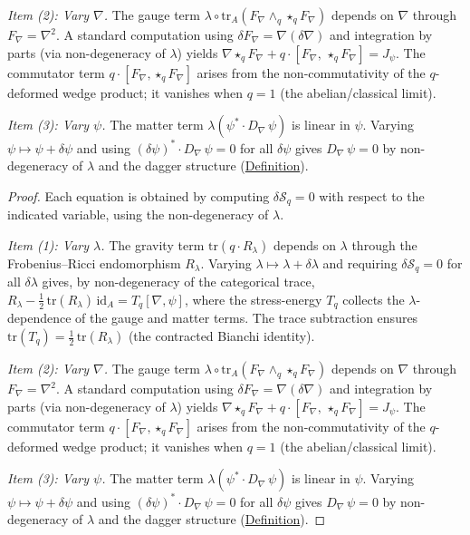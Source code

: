 \begin{proposition}
\emph{Item (2): Vary $\nabla$.}
The gauge term
$\lambda \circ \mathrm{tr}_A(F_\nabla \wedge_q \star_q F_\nabla)$
depends on $\nabla$ through $F_\nabla = \nabla^2$.  A standard
computation using $\delta F_\nabla = \nabla(\delta\nabla)$ and
integration by parts (via non-degeneracy of $\lambda$) yields
$\nabla \star_q F_\nabla + q \cdot [F_\nabla,\, \star_q F_\nabla]
= J_\psi$.
The commutator term $q \cdot [F_\nabla, \star_q F_\nabla]$ arises from
the non-commutativity of the $q$-deformed wedge product; it vanishes
when $q = 1$ (the abelian/classical limit).

\emph{Item (3): Vary $\psi$.}
The matter term $\lambda(\psi^* \cdot D_\nabla\,\psi)$ is linear
in $\psi$.  Varying $\psi \mapsto \psi + \delta\psi$ and using
$(\delta\psi)^* \cdot D_\nabla\,\psi = 0$ for
all $\delta\psi$ gives $D_\nabla\,\psi = 0$ by non-degeneracy
of $\lambda$ and the dagger structure
(\hyperref[def:positive-definite-dagger]{Definition}).
\end{proposition}
\begin{proof}
Each equation is obtained by computing
$\delta\mathcal{S}_q = 0$ with respect to the indicated variable, using
the non-degeneracy of $\lambda$.

\emph{Item (1): Vary $\lambda$.}
The gravity term $\mathrm{tr}(q \cdot R_\lambda)$ depends on $\lambda$
through the Frobenius--Ricci endomorphism $R_\lambda$.  Varying
$\lambda \mapsto \lambda + \delta\lambda$ and requiring
$\delta\mathcal{S}_q = 0$ for all $\delta\lambda$ gives, by
non-degeneracy of the categorical trace,
$R_\lambda - \tfrac{1}{2}\,\mathrm{tr}(R_\lambda)\,\mathrm{id}_A
= T_q[\nabla, \psi]$,
where the stress-energy $T_q$ collects the $\lambda$-dependence of the
gauge and matter terms.  The trace subtraction ensures
$\mathrm{tr}(T_q) = \tfrac{1}{2}\,\mathrm{tr}(R_\lambda)$ (the
contracted Bianchi identity).

\emph{Item (2): Vary $\nabla$.}
The gauge term
$\lambda \circ \mathrm{tr}_A(F_\nabla \wedge_q \star_q F_\nabla)$
depends on $\nabla$ through $F_\nabla = \nabla^2$.  A standard
computation using $\delta F_\nabla = \nabla(\delta\nabla)$ and
integration by parts (via non-degeneracy of $\lambda$) yields
$\nabla \star_q F_\nabla + q \cdot [F_\nabla,\, \star_q F_\nabla]
= J_\psi$.
The commutator term $q \cdot [F_\nabla, \star_q F_\nabla]$ arises from
the non-commutativity of the $q$-deformed wedge product; it vanishes
when $q = 1$ (the abelian/classical limit).

\emph{Item (3): Vary $\psi$.}
The matter term $\lambda(\psi^* \cdot D_\nabla\,\psi)$ is linear
in $\psi$.  Varying $\psi \mapsto \psi + \delta\psi$ and using
$(\delta\psi)^* \cdot D_\nabla\,\psi = 0$ for
all $\delta\psi$ gives $D_\nabla\,\psi = 0$ by non-degeneracy
of $\lambda$ and the dagger structure
(\hyperref[def:positive-definite-dagger]{Definition}).
\end{proof}

